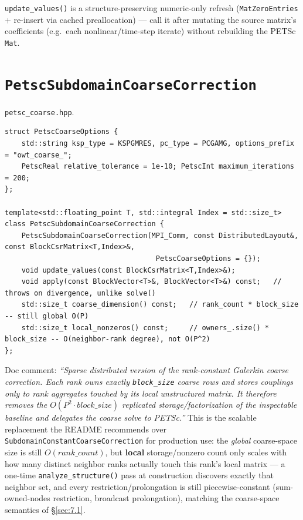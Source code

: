 \documentclass[11pt,a4paper]{report}
\newcommand{\secref}[1]{\S\ref{#1}}
\begin{document}
\lstinline!update_values()! is a structure-preserving numeric-only refresh
(\lstinline!MatZeroEntries! + re-insert via cached preallocation) --- call it
after mutating the source matrix's coefficients (e.g.\ each
nonlinear/time-step iterate) without rebuilding the PETSc \lstinline!Mat!.

\section{\texorpdfstring{\lstinline!PetscSubdomainCoarseCorrection!}{PetscSubdomainCoarseCorrection}}
\label{sec:9.2}

\texttt{petsc\_coarse.hpp}.

\begin{lstlisting}
struct PetscCoarseOptions {
    std::string ksp_type = KSPGMRES, pc_type = PCGAMG, options_prefix = "owt_coarse_";
    PetscReal relative_tolerance = 1e-10; PetscInt maximum_iterations = 200;
};

template<std::floating_point T, std::integral Index = std::size_t>
class PetscSubdomainCoarseCorrection {
    PetscSubdomainCoarseCorrection(MPI_Comm, const DistributedLayout&, const BlockCsrMatrix<T,Index>&,
                                    PetscCoarseOptions = {});
    void update_values(const BlockCsrMatrix<T,Index>&);
    void apply(const BlockVector<T>&, BlockVector<T>&) const;   // throws on divergence, unlike solve()
    std::size_t coarse_dimension() const;   // rank_count * block_size -- still global O(P)
    std::size_t local_nonzeros() const;     // owners_.size() * block_size -- O(neighbor-rank degree), not O(P^2)
};
\end{lstlisting}

Doc comment: \emph{``Sparse distributed version of the rank-constant
Galerkin coarse correction. Each rank owns exactly \lstinline!block_size!
coarse rows and stores couplings only to rank aggregates touched by
its local unstructured matrix. It therefore removes the
$O(P^2\cdot\mathit{block\_size})$ replicated storage/factorization of the
inspectable baseline and delegates the coarse solve to PETSc.''} This
is the scalable replacement the README recommends over
\lstinline!SubdomainConstantCoarseCorrection! for production use: the
\emph{global} coarse-space size is still $O(\mathit{rank\_count})$, but
\textbf{local} storage/nonzero count only scales with how many
distinct neighbor ranks actually touch this rank's local matrix --- a
one-time \lstinline!analyze_structure()! pass at construction discovers
exactly that neighbor set, and every restriction/prolongation is still
piecewise-constant (sum-owned-nodes restriction, broadcast
prolongation), matching the coarse-space semantics of \secref{sec:7.1}.
\end{document}
